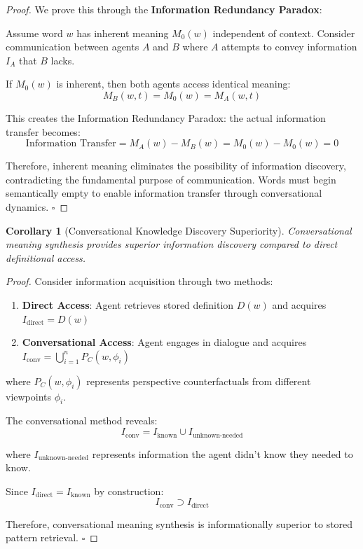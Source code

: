 \documentclass[11pt,a4paper]{article}
\newtheorem{corollary}[theorem]{Corollary}
\begin{document}
\begin{proof}
We prove this through the \textbf{Information Redundancy Paradox}:

Assume word $w$ has inherent meaning $M_0(w)$ independent of context. Consider communication between agents $A$ and $B$ where $A$ attempts to convey information $I_A$ that $B$ lacks.

If $M_0(w)$ is inherent, then both agents access identical meaning:
\begin{equation}
M_B(w,t) = M_0(w) = M_A(w,t)
\end{equation}

This creates the Information Redundancy Paradox: the actual information transfer becomes:
\begin{equation}
\text{Information Transfer} = M_A(w) - M_B(w) = M_0(w) - M_0(w) = 0
\end{equation}

Therefore, inherent meaning eliminates the possibility of information discovery, contradicting the fundamental purpose of communication. Words must begin semantically empty to enable information transfer through conversational dynamics. $\square$
\end{proof}

\begin{corollary}[Conversational Knowledge Discovery Superiority]
Conversational meaning synthesis provides superior information discovery compared to direct definitional access.
\end{corollary}

\begin{proof}
Consider information acquisition through two methods:
\begin{enumerate}
\item \textbf{Direct Access}: Agent retrieves stored definition $D(w)$ and acquires $I_{\text{direct}} = D(w)$
\item \textbf{Conversational Access}: Agent engages in dialogue and acquires $I_{\text{conv}} = \bigcup_{i=1}^n P_C(w,\phi_i)$
\end{enumerate}

where $P_C(w,\phi_i)$ represents perspective counterfactuals from different viewpoints $\phi_i$.

The conversational method reveals:
\begin{equation}
I_{\text{conv}} = I_{\text{known}} \cup I_{\text{unknown-needed}}
\end{equation}

where $I_{\text{unknown-needed}}$ represents information the agent didn't know they needed to know.

Since $I_{\text{direct}} = I_{\text{known}}$ by construction:
\begin{equation}
I_{\text{conv}} \supset I_{\text{direct}}
\end{equation}

Therefore, conversational meaning synthesis is informationally superior to stored pattern retrieval. $\square$
\end{proof}
\end{document}
